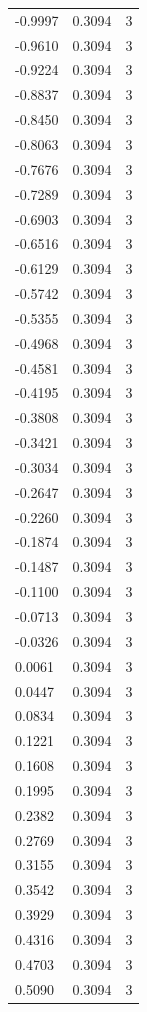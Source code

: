 \begin{longtable}{lrr}
  -0.9997 & 0.3094 & 3 \\
  -0.9610 & 0.3094 & 3 \\
  -0.9224 & 0.3094 & 3 \\
  -0.8837 & 0.3094 & 3 \\
  -0.8450 & 0.3094 & 3 \\
  -0.8063 & 0.3094 & 3 \\
  -0.7676 & 0.3094 & 3 \\
  -0.7289 & 0.3094 & 3 \\
  -0.6903 & 0.3094 & 3 \\
  -0.6516 & 0.3094 & 3 \\
  -0.6129 & 0.3094 & 3 \\
  -0.5742 & 0.3094 & 3 \\
  -0.5355 & 0.3094 & 3 \\
  -0.4968 & 0.3094 & 3 \\
  -0.4581 & 0.3094 & 3 \\
  -0.4195 & 0.3094 & 3 \\
  -0.3808 & 0.3094 & 3 \\
  -0.3421 & 0.3094 & 3 \\
  -0.3034 & 0.3094 & 3 \\
  -0.2647 & 0.3094 & 3 \\
  -0.2260 & 0.3094 & 3 \\
  -0.1874 & 0.3094 & 3 \\
  -0.1487 & 0.3094 & 3 \\
  -0.1100 & 0.3094 & 3 \\
  -0.0713 & 0.3094 & 3 \\
  -0.0326 & 0.3094 & 3 \\
  0.0061 & 0.3094 & 3 \\
  0.0447 & 0.3094 & 3 \\
  0.0834 & 0.3094 & 3 \\
  0.1221 & 0.3094 & 3 \\
  0.1608 & 0.3094 & 3 \\
  0.1995 & 0.3094 & 3 \\
  0.2382 & 0.3094 & 3 \\
  0.2769 & 0.3094 & 3 \\
  0.3155 & 0.3094 & 3 \\
  0.3542 & 0.3094 & 3 \\
  0.3929 & 0.3094 & 3 \\
  0.4316 & 0.3094 & 3 \\
  0.4703 & 0.3094 & 3 \\
  0.5090 & 0.3094 & 3 \\

\end{longtable}
